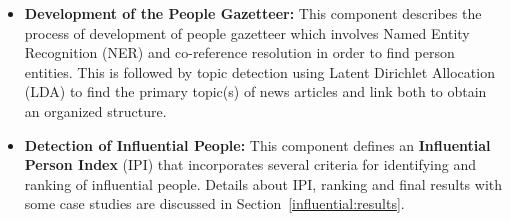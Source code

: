 \begin{itemize}
\item \textbf{Development of the People Gazetteer: }This component describes the process of development
of people gazetteer which involves Named Entity Recognition (NER) and co-reference resolution in order to find person
entities. This is followed by topic detection using Latent Dirichlet Allocation (LDA) to find the primary topic(s) of news articles
and link both to obtain an organized structure.

\item \textbf{Detection of Influential People: } This component defines an \textbf{Influential Person Index}
(IPI) that incorporates several criteria for identifying and ranking of influential
people. Details about IPI, ranking and final results with some case studies are discussed in Section~\ref{influential:results}.
\end{itemize}